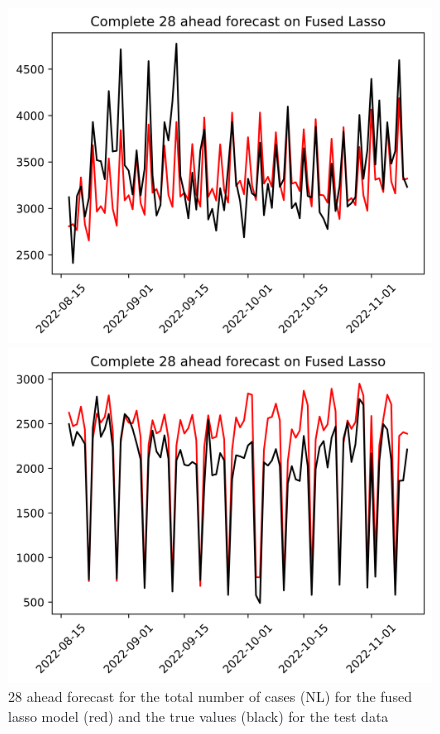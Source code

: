 \begin{figure}

\begin{minipage}{.32\textwidth}
  \centering
  \includegraphics[width=\linewidth]{pics/28_ah/Complete_28_ahead_Fused Lasso.png}
  \caption{28 ahead forecast for the total number of cases (NL) for the fused lasso model (red) and the true values (black) for the test data}
  \label{fig:tot_cases_fc_28_flasso}
\end{minipage}
\begin{minipage}{.32\textwidth}
  \centering
  \includegraphics[width=\linewidth]{pics/28_ah/DE_Complete_28_ahead_Fused Lasso.png}

\end{minipage}
\end{figure}
